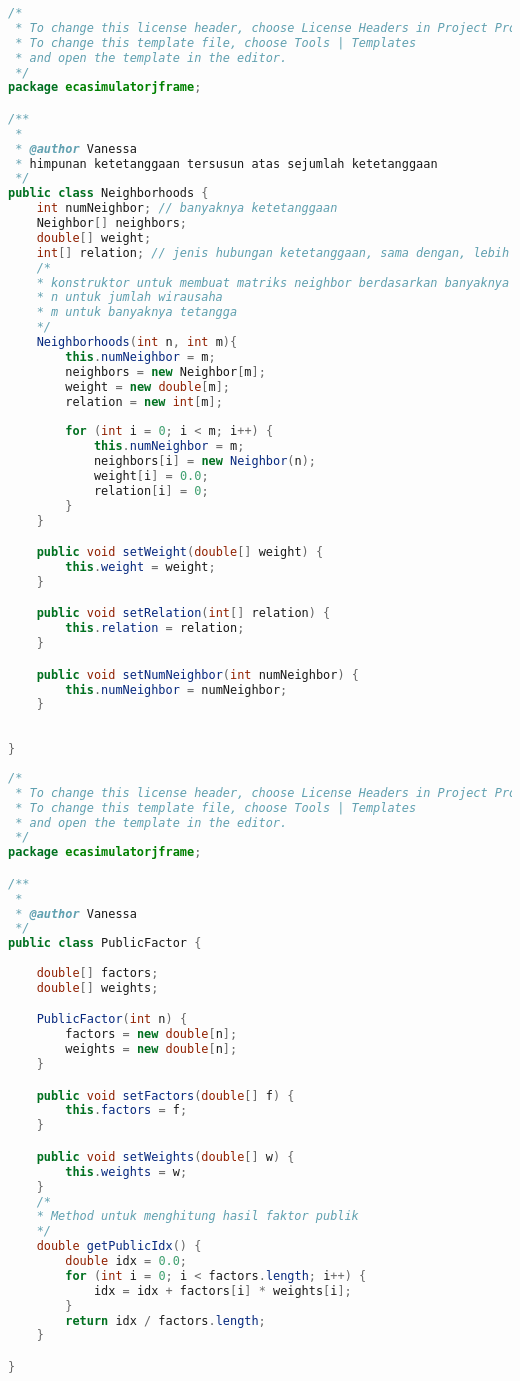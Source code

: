 \begin{lstlisting}[language=Java, caption=Neighborhoods.java]
/*
 * To change this license header, choose License Headers in Project Properties.
 * To change this template file, choose Tools | Templates
 * and open the template in the editor.
 */
package ecasimulatorjframe;

/**
 *
 * @author Vanessa
 * himpunan ketetanggaan tersusun atas sejumlah ketetanggaan
 */
public class Neighborhoods {
    int numNeighbor; // banyaknya ketetanggaan
    Neighbor[] neighbors;
    double[] weight;
    int[] relation; // jenis hubungan ketetanggaan, sama dengan, lebih kecil atau yang lain --> perlu didefinisikan
    /*
    * konstruktor untuk membuat matriks neighbor berdasarkan banyaknya tetangga
    * n untuk jumlah wirausaha
    * m untuk banyaknya tetangga
    */
    Neighborhoods(int n, int m){
        this.numNeighbor = m;
        neighbors = new Neighbor[m];
        weight = new double[m];
        relation = new int[m];
        
        for (int i = 0; i < m; i++) {
            this.numNeighbor = m;
            neighbors[i] = new Neighbor(n);
            weight[i] = 0.0;
            relation[i] = 0;
        }
    }

    public void setWeight(double[] weight) {
        this.weight = weight;
    }

    public void setRelation(int[] relation) {
        this.relation = relation;
    }

    public void setNumNeighbor(int numNeighbor) {
        this.numNeighbor = numNeighbor;
    }
    
    
}
\end{lstlisting}

\begin{lstlisting}[language=Java, caption=PublicFactor.java]
/*
 * To change this license header, choose License Headers in Project Properties.
 * To change this template file, choose Tools | Templates
 * and open the template in the editor.
 */
package ecasimulatorjframe;

/**
 *
 * @author Vanessa
 */
public class PublicFactor {
    
    double[] factors;
    double[] weights;

    PublicFactor(int n) {
        factors = new double[n];
        weights = new double[n];
    }

    public void setFactors(double[] f) {
        this.factors = f;
    }

    public void setWeights(double[] w) {
        this.weights = w;
    }
    /*
    * Method untuk menghitung hasil faktor publik
    */
    double getPublicIdx() {
        double idx = 0.0;
        for (int i = 0; i < factors.length; i++) {
            idx = idx + factors[i] * weights[i];
        }
        return idx / factors.length;
    }

}

\end{lstlisting}

